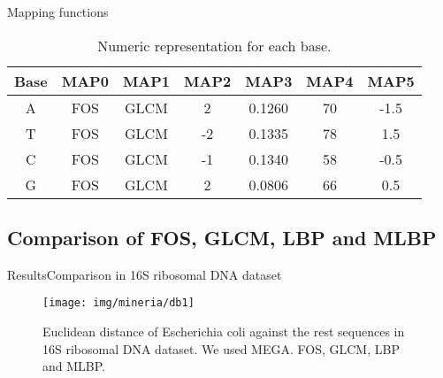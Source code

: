 \documentclass[10pt]{beamer}
\newcommand{\1}{
	\setbeamertemplate{background}{
		\texttt{[image: img/1]}
		\tikz[overlay] \fill[fill opacity=0.75,fill=white] (0,0) rectangle (-\paperwidth,\paperheight);
	}
}
\begin{document}
\begin{frame}{Mapping functions}
	
	\begin{table}[h]
		\centering
		\caption{Numeric representation for each base.}
		\label{tab:mapping function}
		\setlength{\tabcolsep}{0.5em} %
		{\renewcommand{\arraystretch}{1}%
			\begin{tabular}{ccccccc}
				\hline
				Base           	&  MAP0 & MAP1 	& MAP2  & MAP3 & MAP4 & MAP5 \\ \hline
				A      			& FOS & GLCM	& 2 & 0.1260 & 70 & -1.5 \\ 
				T          	   	& FOS	& GLCM	& -2 & 0.1335 & 78 & 1.5 \\ 
				C      			& FOS	& GLCM	& -1 & 0.1340 & 58 & -0.5 \\ 
				G				& FOS	& GLCM	& 2 & 0.0806 & 66 & 0.5 \\ \hline
			\end{tabular}
		}
	\end{table}
\end{frame}


\subsection{Comparison of FOS, GLCM, LBP and MLBP}

\begin{frame}{Results}{Comparison in 16S ribosomal DNA dataset}
\begin{figure}[]
	\centering
	\texttt{[image: img/mineria/db1]}
	\caption{Euclidean distance of Escherichia coli against the rest sequences in 16S ribosomal DNA dataset. We used MEGA. FOS, GLCM, LBP and MLBP.}
	\label{img:comp1}
\end{figure}
\end{frame}
\end{document}
